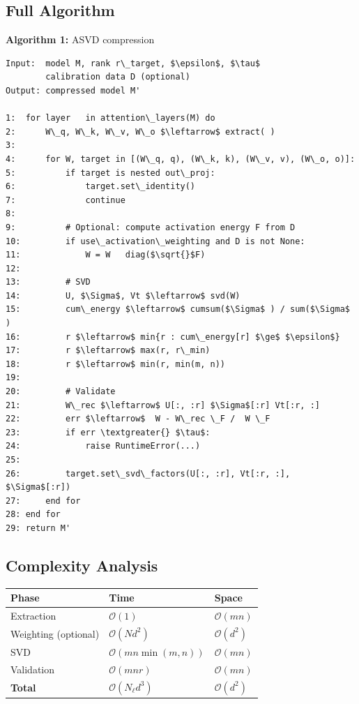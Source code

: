 \subsection{Full Algorithm}

\textbf{Algorithm 1:} ASVD compression
\begin{lstlisting}
Input:  model M, rank r\_target, $\epsilon$, $\tau$
        calibration data D (optional)
Output: compressed model M'

1:  for layer   in attention\_layers(M) do
2:      W\_q, W\_k, W\_v, W\_o $\leftarrow$ extract( )
3:
4:      for W, target in [(W\_q, q), (W\_k, k), (W\_v, v), (W\_o, o)]:
5:          if target is nested out\_proj:
6:              target.set\_identity()
7:              continue
8:
9:          # Optional: compute activation energy F from D
10:         if use\_activation\_weighting and D is not None:
11:             W = W   diag($\sqrt{}$F)
12:
13:         # SVD
14:         U, $\Sigma$, Vt $\leftarrow$ svd(W)
15:         cum\_energy $\leftarrow$ cumsum($\Sigma$ ) / sum($\Sigma$ )
16:         r $\leftarrow$ min{r : cum\_energy[r] $\ge$ $\epsilon$}
17:         r $\leftarrow$ max(r, r\_min)
18:         r $\leftarrow$ min(r, min(m, n))
19:
20:         # Validate
21:         W\_rec $\leftarrow$ U[:, :r] $\Sigma$[:r] Vt[:r, :]
22:         err $\leftarrow$  W - W\_rec \_F /  W \_F
23:         if err \textgreater{} $\tau$:
24:             raise RuntimeError(...)
25:
26:         target.set\_svd\_factors(U[:, :r], Vt[:r, :], $\Sigma$[:r])
27:     end for
28: end for
29: return M'
\end{lstlisting}

\subsection{Complexity Analysis}

\begin{table}[H]
\centering
\small
\begin{tabular}{lll}
\toprule
\textbf{Phase} & \textbf{Time} & \textbf{Space} \\
\midrule
Extraction & $\mathcal{O}(1)$ & $\mathcal{O}(m n)$ \\
Weighting (optional) & $\mathcal{O}(N d^2)$ & $\mathcal{O}(d^2)$ \\
SVD & $\mathcal{O}(m n \min(m, n))$ & $\mathcal{O}(m n)$ \\
Validation & $\mathcal{O}(m n r)$ & $\mathcal{O}(m n)$ \\
\textbf{Total} & $\mathcal{O}(N_\ell d^3)$ & $\mathcal{O}(d^2)$ \\
\bottomrule
\end{tabular}
\end{table}

